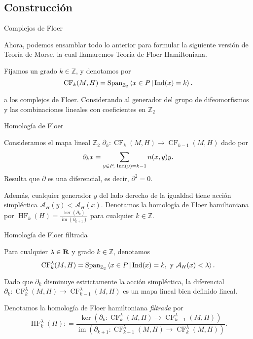 \documentclass{beamer}
\DeclareMathOperator{\im}{im}
\def\CF{\operatorname{CF}}
\def\HF{\operatorname{HF}}
\def\Z{{\mathbb Z}}
\def\R\re
\def \R{{\bf R}}
\def \re{{\mathbb R}}
\begin{document}
\subsection{Construcción}

\begin{frame}{Complejos de Floer}

Ahora, podemos ensamblar todo lo anterior para formular la siguiente versión de Teoría de Morse, la cual llamaremos Teoría de Floer Hamiltoniana. \pause

Fijamos un grado $k \in \Z$, y denotamos por
\[ \CF_k(M, H) = {\rm Span}_{\Z_2} \left<x \in P \,| \, {\rm Ind}(x) = k \right>. \]

a los complejos de Floer. Considerando al generador del grupo de difeomorfismos y las combinaciones lineales con coeficientes en \(\Z_2\)

\end{frame}

\begin{frame}{Homología de Floer}

Consideramos el mapa lineal $\Z_2$ $\partial_k: \CF_k(M, H) \to \CF_{k-1}(M, H)$ dado por
\[
\partial_k x = \sum_{y \in P, \,\,{\rm Ind}(y) = k-1} n(x,y) y.
\]
Resulta que $\partial$ es una diferencial, es decir, $\partial^2 =0$. \pause

Además, cualquier generador $y$ del lado derecho de la igualdad tiene acción simpléctica $\mathcal A_H(y) < \mathcal A_H(x)$. \pause Denotamos la homología de Floer hamiltoniana por $\HF_k(H) = \frac{\ker(\partial_k)}{{\im}(\partial_{k+1})}$ para cualquier $k \in \Z$.

\end{frame}

\begin{frame}{Homología de Floer filtrada}

Para cualquier $\lambda \in \R$ y grado $k \in \Z$, denotamos
\[ \CF^{\lambda}_k(M, H) = {\rm Span}_{\Z_2} \left< x \in P \, | \, {\rm Ind}(x) = k, \,\,\mbox{y}\,\, \mathcal A_H(x) < \lambda \right>. \] \pause

Dado que $\partial_k$ disminuye estrictamente la acción simpléctica, la diferencial $\partial_k: \CF^{\lambda}_k(M, H) \to \CF_{k-1}^{\lambda}(M,H)$ es un mapa lineal bien definido lineal. \pause

Denotamos la homología de Floer hamiltoniana {\it filtrada} por
\[ \HF_k^{\lambda}(H) : = \frac{\ker(\partial_k: \CF^{\lambda}_k(M, H) \to \CF_{k-1}^{\lambda}(M,H))}{{\im}(\partial_{k+1}: \CF^{\lambda}_{k+1}(M, H) \to \CF_{k}^{\lambda}(M,H))}. \]


    
\end{frame}
\end{document}
